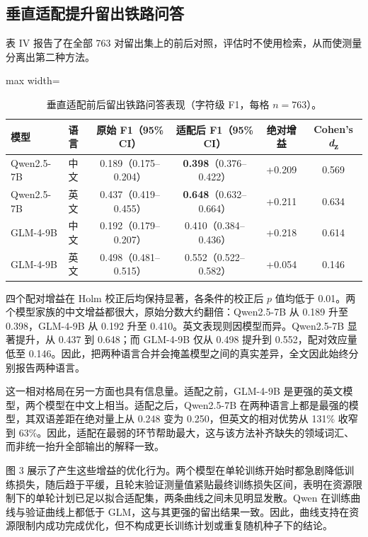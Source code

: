 \documentclass{article}
\begin{document}
\subsection{垂直适配提升留出铁路问答}

表 IV 报告了在全部 763 对留出集上的前后对照，评估时不使用检索，从而使测量分离出第二种方法。

\begin{table}[ht]
\centering
\caption{垂直适配前后留出铁路问答表现（字符级 F1，每格 $n=763$）。}

\small
\begin{adjustbox}{max width=\linewidth}
\begin{tabular}{llcccc}
\toprule
模型 & 语言 & 原始 F1（95\% CI） & 适配后 F1（95\% CI） & 绝对增益 & Cohen's \emph{d}\textsubscript{z} \\
\midrule
Qwen2.5-7B & 中文 & 0.189（0.175--0.204） & \textbf{0.398}（0.376--0.422） & +0.209 & 0.569 \\
Qwen2.5-7B & 英文 & 0.437（0.419--0.455） & \textbf{0.648}（0.632--0.664） & +0.211 & 0.634 \\
GLM-4-9B & 中文 & 0.192（0.179--0.207） & 0.410（0.384--0.436） & +0.218 & 0.614 \\
GLM-4-9B & 英文 & 0.498（0.481--0.515） & 0.552（0.522--0.582） & +0.054 & 0.146 \\
\bottomrule
\end{tabular}
\end{adjustbox}
\end{table}

四个配对增益在 Holm 校正后均保持显著，各条件的校正后 $p$ 值均低于 0.01。两个模型家族的中文增益都很大，原始分数大约翻倍：Qwen2.5-7B 从 0.189 升至 0.398，GLM-4-9B 从 0.192 升至 0.410。英文表现则因模型而异。Qwen2.5-7B 显著提升，从 0.437 到 0.648；而 GLM-4-9B 仅从 0.498 提升到 0.552，配对效应量低至 0.146。因此，把两种语言合并会掩盖模型之间的真实差异，全文因此始终分别报告两种语言。

这一相对格局在另一方面也具有信息量。适配之前，GLM-4-9B 是更强的英文模型，两个模型在中文上相当。适配之后，Qwen2.5-7B 在两种语言上都是最强的模型，其双语差距在绝对量上从 0.248 变为 0.250，但英文的相对优势从 131\% 收窄到 63\%。因此，适配在最弱的环节帮助最大，这与该方法补齐缺失的领域词汇、而非统一抬升全部输出的解释一致。

图 3 展示了产生这些增益的优化行为。两个模型在单轮训练开始时都急剧降低训练损失，随后趋于平缓，且轮末验证测量值紧贴最终训练损失区间，表明在资源限制下的单轮计划已足以拟合适配集，两条曲线之间未见明显发散。Qwen 在训练曲线与验证曲线上都低于 GLM，这与其更强的留出结果一致。因此，曲线支持在资源限制内成功完成优化，但不构成更长训练计划或重复随机种子下的结论。
\end{document}

